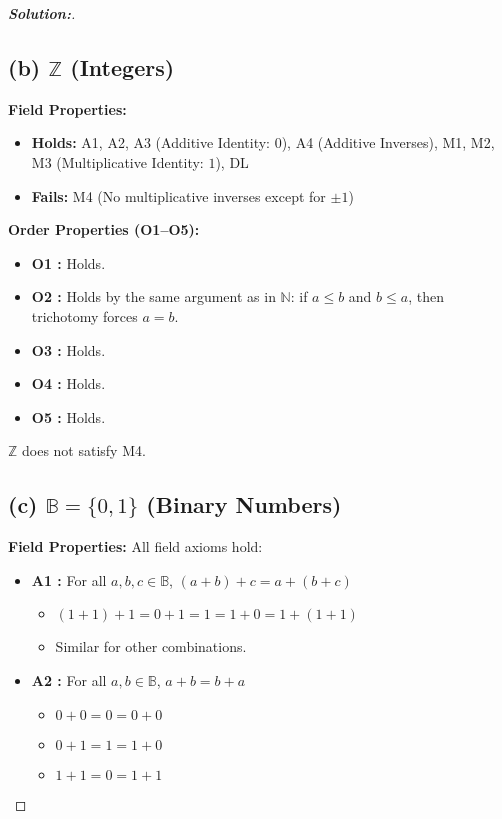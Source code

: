 \documentclass[12pt]{article}
\theoremstyle{definition}\newtheorem{problem}{Problem}
\newenvironment{solution}{\begin{proof}[\bfseries\textup{Solution:}]}{\end{proof}}
\newcommand{\B}{\mathbb{B}}
\begin{document}
\begin{solution}
    \subsection*{(b) $\mathbb{Z}$ (Integers)}
        
    \textbf{Field Properties:}
    \begin{itemize}
        \item \textbf{Holds:}  
        A1, A2, A3 (Additive Identity: $0$), A4 (Additive Inverses),  
        M1, M2, M3 (Multiplicative Identity: $1$), DL
            
        \item \textbf{Fails:}  
        M4 (No multiplicative inverses except for $\pm 1$)
    \end{itemize}
        
    \textbf{Order Properties (O1–O5):}
    \begin{itemize}
        \item \textbf{O1 :} Holds.
        \item \textbf{O2 :} Holds by the same argument as in $\mathbb{N}$: if $a \le b$ and $b \le a$, then trichotomy forces $a = b$.
        \item \textbf{O3 :} Holds.
        \item \textbf{O4 :} Holds.
        \item \textbf{O5 :} Holds.
    \end{itemize}
        
    $\mathbb{Z}$ does not satisfy M4.
    
    \subsection*{(c) $\mathbb{B} = \{0, 1\}$ (Binary Numbers)}
        
    \textbf{Field Properties:}  
    All field axioms hold:
    \begin{itemize}
        \item \textbf{A1 :} For all $a,b,c \in \B$, $(a + b) + c = a + (b + c)$
        \begin{itemize}
            \item $(1 + 1) + 1 = 0 + 1 = 1 = 1 + 0 = 1 + (1 + 1)$
            \item Similar for other combinations.
        \end{itemize}

        \item \textbf{A2 :} For all $a,b \in \B$, $a + b = b + a$
            \begin{itemize}
                \item $0 + 0 = 0 = 0 + 0$
                \item $0 + 1 = 1 = 1 + 0$
                \item $1 + 1 = 0 = 1 + 1$
            \end{itemize}
        

\end{itemize}
\end{solution}
\end{document}
